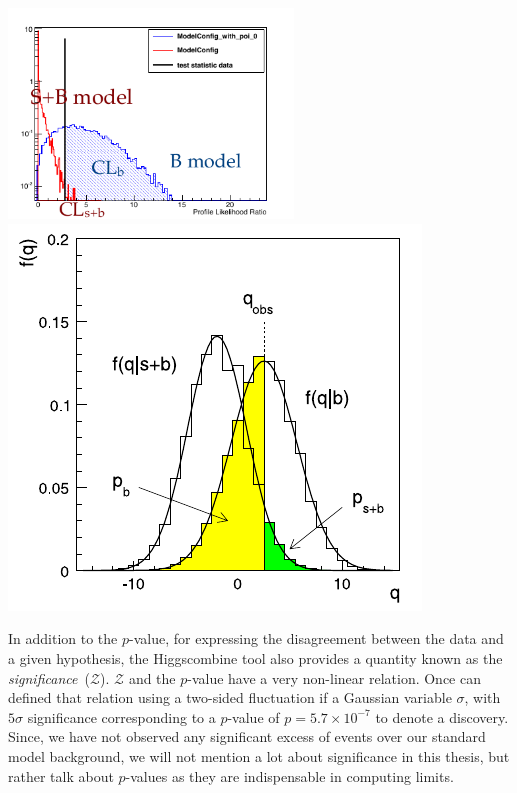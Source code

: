 \begin{center}
\centering
\includegraphics[height=2.2in]{THESISPLOTS/Asymptotics_Test_Stats.png}
\includegraphics[scale=0.6]{THESISPLOTS/TEST_STATISTICS.png}
\label{fig:LIM}
\end{center}


\par In addition to the $p$-value, for expressing the disagreement between the data and a given hypothesis, the Higgscombine tool also provides a quantity known as the \textit{significance}~($\mathcal{Z}$). $\mathcal{Z}$ and the $p$-value have a very non-linear relation. Once can defined that relation using a two-sided fluctuation if a Gaussian variable $\sigma$, with $5\sigma$ significance corresponding to a $p$-value of $p = 5.7 \times 10^{-7}$ to denote a discovery. Since, we have not observed any significant excess of events over our standard model background, we will not mention a lot about significance in this thesis, but rather talk about $p$-values as they are indispensable in computing limits.

